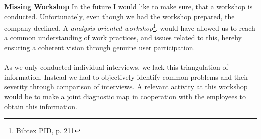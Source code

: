 \textbf{Missing Workshop}
In the future I would like to make sure, that a workshop is conducted. Unfortunately, even though we had the workshop prepared, the company declined. A \textit{analysis-oriented workshop}\footnote{Bibtex PID, p. 211}, would have allowed us to reach a common understanding of work practices, and issues related to this, hereby ensuring a coherent vision through genuine user participation. 
\\\\
As we only conducted individual interviews, we lack this triangulation of information. Instead we had to objectively identify common problems and their severity through comparison of interviews. A relevant activity at this workshop would be to make a joint diagnostic map in cooperation with the employees to obtain this information.